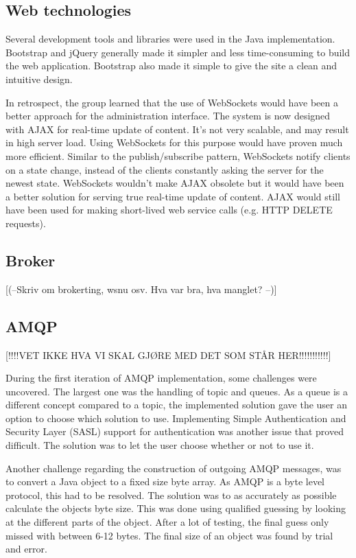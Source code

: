 \subsection{Web technologies}
\label{subsec:Web_technologies}

Several development tools and libraries were used in the Java implementation. Bootstrap and jQuery generally made it simpler and less time-consuming to build the web application. Bootstrap also made it simple to give the site a clean and intuitive design. 

In retrospect, the group learned that the use of WebSockets \cite{web-sockets} would have been a better approach for the administration interface. The system is now designed with AJAX for real-time update of content. It's not very scalable, and may result in high server load. Using WebSockets for this purpose would have proven much more efficient. Similar to the publish/subscribe pattern, WebSockets notify clients on a state change, instead of the clients constantly asking the server for the newest state. WebSockets wouldn't make AJAX obsolete but it would have been a better solution for serving true real-time update of content. AJAX would still have been used for making short-lived web service calls (e.g. HTTP DELETE requests). \\


\subsection{Broker}
\label{subsec:Implementation_broker}
[(--Skriv om brokerting, wsnu osv. Hva var bra, hva manglet? --)]

\subsection{AMQP}
\label{subsec:Implementation_AMQP}

[!!!!VET IKKE HVA VI SKAL GJØRE MED DET SOM STÅR HER!!!!!!!!!!!]

During the first iteration of AMQP implementation, some challenges were uncovered. The largest one was the handling of topic and queues. As a queue is a different concept compared to a topic, the implemented solution gave the user an option to choose which solution to use. Implementing Simple Authentication and Security Layer (SASL) support for authentication was another issue that proved difficult. The solution was to let the user choose whether or not to use it.

Another challenge regarding the construction of outgoing AMQP messages, was to convert a Java object to a fixed size byte array. As AMQP is a byte level protocol, this had to be resolved. The solution was to as accurately as possible calculate the objects byte size. This was done using qualified guessing by looking at the different parts of the object. After a lot of testing, the final guess only missed with between 6-12 bytes. The final size of an object was found by trial and error.

